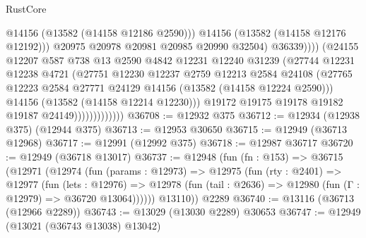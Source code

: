 \begin{lexlean}{RustCore}
\begin{coremodule}
                                        @14156
                                        (@13582 (@14158 @12186 @2590)))
                                      @14156
                                      (@13582 (@14158 @12176 @12192)))
                                    @20975
                                    @20978
                                    @20981
                                    @20985
                                    @20990
                                    @32504)
                                  @36339))))
                          (@24155
                            @12207
                            @587
                            @738
                            @13
                            @2590
                            @4842
                            @12231
                            @12240
                            @31239
                            (@27744
                              @12231
                              @12238
                              @4721
                              (@27751
                                @12230
                                @12237
                                @2759
                                @12213
                                @2584
                                @24108
                                (@27765
                                  @12223
                                  @2584
                                  @27771
                                  @24129
                                  @14156
                                  (@13582 (@14158 @12224 @2590)))
                                @14156
                                (@13582 (@14158 @12214 @12230)))
                              @19172
                              @19175
                              @19178
                              @19182
                              @19187
                              @24149)))))))))))))
@36708 := @12932 @375
@36712 := @12934 (@12938 @375) (@12944 @375)
@36713 := @12953 @30650
@36715 := @12949 (@36713 @12968)
@36717 := @12991 (@12992 @375)
@36718 := @12987 @36717
@36720 := @12949 (@36718 @13017)
@36737 := @12948
    (fun (fn : @153) =>
    @36715
      (@12971
        (@12974
          (fun (params : @12973) =>
          @12975
            (fun (rty : @2401) =>
            @12977
              (fun (lets : @12976) =>
              @12978 (fun (tail : @2636) => @12980 (fun (Γ : @12979) => @36720 @13064))))))
        @13110))
    @2289
@36740 := @13116 (@36713 (@12966 @2289))
@36743 := @13029 (@13030 @2289) @30653
@36747 := @12949 (@13021 (@36743 @13038) @13042)

\end{coremodule}
\end{lexlean}
